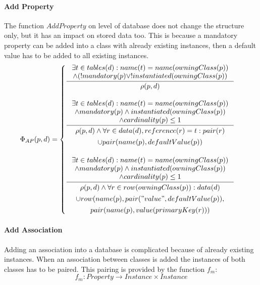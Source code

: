 \documentclass[11pt]{article}
\begin{document}
\paragraph{Add Property} The function $AddProperty$ on level of database does not change the structure only, but it has an impact on stored data too. This is because a mandatory property can be added into a class with already existing instances, then a default value has to be added to all existing instances.
$$
\Phi_{AP}(p, d) = \begin{cases}
\inference{ \exists t \in tables(d) : name(t) = name(owningClass(p)) \\ \wedge (! mandatory(p) \vee ! instantiated(owningClass(p))}{ \rho(p,d)} 
\\ \\ 
\inference{ \exists t \in tables(d) : name(t) = name(owningClass(p)) \\ \wedge mandatory(p) \wedge instantiated(owningClass(p)) \\ \wedge cardinality(p) \leq 1}{\begin{gathered}
 \rho(p,d) \wedge \forall r \in data(d), reference(r) = t : pair(r) \\ \cup pair(name(p), defaultValue(p))
\end{gathered}
} 
\\ \\
\inference{ \exists t \in tables(d) : name(t) = name(owningClass(p)) \\ \wedge mandatory(p) \wedge instantiated(owningClass(p)) \\ \wedge cardinality(p) \leq 1}{\begin{gathered}
 \rho(p,d) \wedge \forall r \in row(owningClass(p)) : data(d)\\ \cup row(name(p), pair("value", defaultValue(p)), \\ pair(name(p), value(primaryKey(r))) 
\end{gathered}
} 

\end{cases}
$$

\paragraph{Add Association} Adding an association into a database is complicated because of already existing instances. When an association between classes is added the instances of both classes has to be paired. This pairing is provided by the function $f_m$:
$$f_m : Property \rightarrow Instance \times Instance $$
\end{document}
